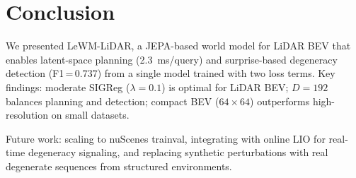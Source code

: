 \documentclass[10pt,twocolumn,letterpaper]{article}
\begin{document}
\section{Conclusion}
\label{sec:conclusion}

We presented LeWM-LiDAR, a JEPA-based world model for LiDAR BEV that
enables latent-space planning (2.3~ms/query) and surprise-based
degeneracy detection (F1\,=\,0.737) from a single model trained with
two loss terms. Key findings: moderate SIGReg ($\lambda{=}0.1$) is
optimal for LiDAR BEV; $D{=}192$ balances planning and detection;
compact BEV ($64{\times}64$) outperforms high-resolution on small datasets.

Future work: scaling to nuScenes trainval, integrating with online LIO
for real-time degeneracy signaling, and replacing synthetic perturbations
with real degenerate sequences from structured environments.



\end{document}
